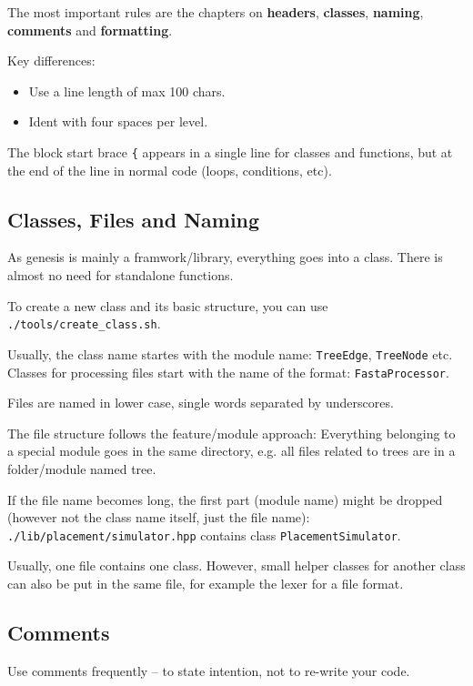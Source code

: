 \documentclass[a4paper,10pt]{article}
\begin{document}
The most important rules are the chapters on \textbf{headers}, \textbf{classes}, \textbf{naming}, \textbf{comments} and \textbf{formatting}.

Key differences:
\begin{itemize}
    \item Use a line length of max 100 chars.
    \item Ident with four spaces per level.
\end{itemize}

The block start brace \verb|{| appears in a single line for classes and functions, but at the end of the line in normal code (loops, conditions, etc).

\subsection{Classes, Files and Naming}
\label{sec:CodingConventions:sub:ClassesFilesNaming}

As genesis is mainly a framwork/library, everything goes into a class. There is almost no need for standalone functions.

To create a new class and its basic structure, you can use \verb|./tools/create_class.sh|.

Usually, the class name startes with the module name: \verb|TreeEdge|, \verb|TreeNode| etc. Classes for processing files start with the name of the format: \verb|FastaProcessor|.

Files are named in lower case, single words separated by underscores.

The file structure follows the feature/module approach: Everything belonging to a special module goes in the same directory, e.g. all files related to trees are in a folder/module named tree. 

If the file name becomes long, the first part (module name) might be dropped (however not the class name itself, just the file name): \verb|./lib/placement/simulator.hpp| contains class \verb|PlacementSimulator|.

Usually, one file contains one class. However, small helper classes for another class can also be put in the same file, for example the lexer for a file format.

\subsection{Comments}
\label{sec:CodingConventions:sub:Comments}

Use comments frequently -- to state intention, not to re-write your code.
\end{document}
